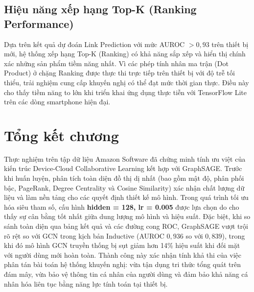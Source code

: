 \subsection{Hiệu năng xếp hạng Top-K (Ranking Performance)}

Dựa trên kết quả dự đoán Link Prediction với mức AUROC $> 0{,}93$ trên thiết bị mới, hệ thống xếp hạng Top-K (Ranking) có khả năng sắp xếp và hiển thị chính xác những sản phẩm tiềm năng nhất. Vì các phép tính nhân ma trận (Dot Product) ở chặng Ranking được thực thi trực tiếp trên thiết bị với độ trễ tối thiểu, trải nghiệm cung cấp khuyến nghị có thể đạt mức thời gian thực. Điều này cho thấy tiềm năng to lớn khi triển khai ứng dụng thực tiễn với TensorFlow Lite trên các dòng smartphone hiện đại.

\section{Tổng kết chương}

Thực nghiệm trên tập dữ liệu Amazon Software đã chứng minh tính ưu việt của kiến trúc Device-Cloud Collaborative Learning kết hợp với GraphSAGE. Trước khi huấn luyện, phân tích toàn diện đồ thị dị nhất (bao gồm mật độ, phân phối bậc, PageRank, Degree Centrality và Cosine Similarity) xác nhận chất lượng dữ liệu và làm nền tảng cho các quyết định thiết kế mô hình. Trong quá trình tối ưu hóa siêu tham số, cấu hình \textbf{hidden = 128, lr = 0.005} được lựa chọn do cho thấy sự cân bằng tốt nhất giữa dung lượng mô hình và hiệu suất. Đặc biệt, khi so sánh toàn diện qua bảng kết quả và các đường cong ROC, GraphSAGE vượt trội rõ rệt so với GCN trong kịch bản Inductive (AUROC $0{,}936$ so với $0{,}839$), trong khi đó mô hình GCN truyền thống bị sụt giảm hơn 14\% hiệu suất khi đối mặt với người dùng mới hoàn toàn. Thành công này xác nhận tính khả thi của việc phân tán bài toán hệ thống khuyến nghị: vừa tận dụng tri thức tổng quát trên đám mây, vừa bảo vệ thông tin cá nhân của người dùng và đảm bảo khả năng cá nhân hóa liên tục bằng năng lực tính toán tại thiết bị.
